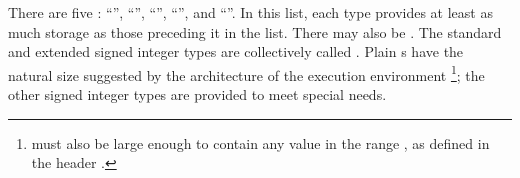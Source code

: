 \pnum
{}%
There are five  :
%
%
%
%
%
``'', ``'', ``'',
``'', and ``''. In
this list, each type provides at least as much storage as those
preceding it in the list.
%
%
There may also be 
.
The standard and
extended signed integer types are collectively called
.
%
Plain
s have the natural size suggested by the architecture of the
execution environment%
\footnote{ must also be large enough
to contain any value in the range
,
as defined in the header .};
the other signed integer types are provided to meet special needs.

